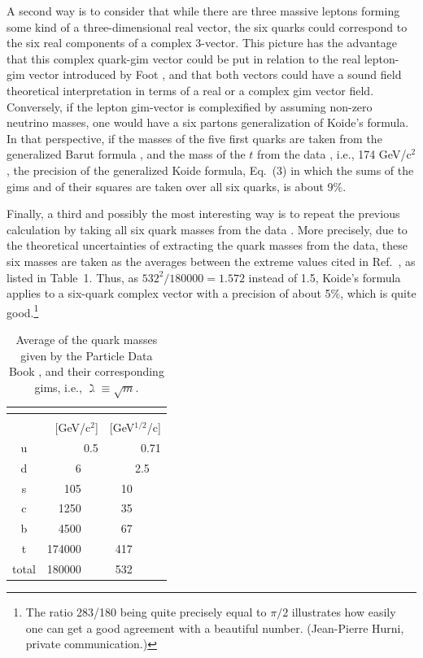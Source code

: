 \documentclass[12pt,a4paper]{article}
\begin{document}
A second way is to consider that while there are three massive leptons forming some kind of a three-dimensional real vector, the six quarks could correspond to the six real components of a complex 3-vector.  This picture has the advantage that this complex quark-gim vector could be put in relation to the real lepton-gim vector introduced by Foot \cite{foot}, and that both vectors could have a sound field theoretical interpretation in terms of a real or a complex gim vector field.  Conversely, if the lepton gim-vector is complexified by assuming non-zero neutrino masses, one would have a six partons generalization of Koide's formula.  In that perspective, if the masses of the five first quarks are taken from the generalized Barut formula \cite{gh1995}, and the mass of the $t$ from the data \cite{pdb2004}, i.e., 174 GeV/c$^2$, the precision of the generalized Koide formula, Eq.~(3) in which the sums of the gims and of their squares are taken over all six quarks, is about 9\%.

Finally, a third and possibly the most interesting way is to repeat the previous calculation by taking all six quark masses from the data \cite{pdb2004}.  More precisely, due to the theoretical uncertainties of extracting the quark masses from the data, these six masses are taken as the averages between the extreme values cited in Ref.~\cite{pdb2004}, as listed in Table~1.  Thus, as ${532}^2/180000 = 1.572$ instead of 1.5, Koide's formula applies to a six-quark complex vector with a precision of about 5\%, which is quite good.\footnote{The ratio 283/180 being quite precisely equal to $\pi/2$ illustrates how easily one can get a good agreement with a beautiful number. (Jean-Pierre Hurni, private communication.)}


\begin{table}
\begin{center}
\hskip 0.0cm \begin{tabular}{|c|r|r|}
\hline
\multicolumn{3}{|c|}{\raisebox{+0.2em}{{\bf  \rule{0mm}{6mm} Quark masses and gims}}} \\ 
\hline
\raisebox{+0.2em}{~} \rule{0mm}{6mm} & 
\raisebox{+0.2em}{$m$~~~~~ } & 
\raisebox{+0.2em}{$\gimel$~~~~~~  } \\ 
 
\rule{0mm}{0mm} ~~~ & 
[GeV/c$^2$]                 &
[GeV$^{1/2}$/c]                 \\
\hline
\rule{0mm}{5mm}
u   &        0.5  &    0.71   \\
d   &        6~~~ &   2.5~~   \\
s   &      105~~~ &   10~~~~~ \\
c   &     1250~~~ &   35~~~~~ \\
b   &     4500~~~ &   67~~~~~ \\
t   &   174000~~~ &  417~~~~~ \\
\hline
\rule{0mm}{5mm} total
    &   180000~~~ &  532~~~~~ \\
\hline
\end{tabular}
\end{center}
\caption[Quark masses and gims]{Average of the quark masses given by the Particle Data Book \cite{pdb2004}, and their corresponding gims, i.e., $\gimel \equiv \sqrt{m}$.}    \end{table}
\end{document}
